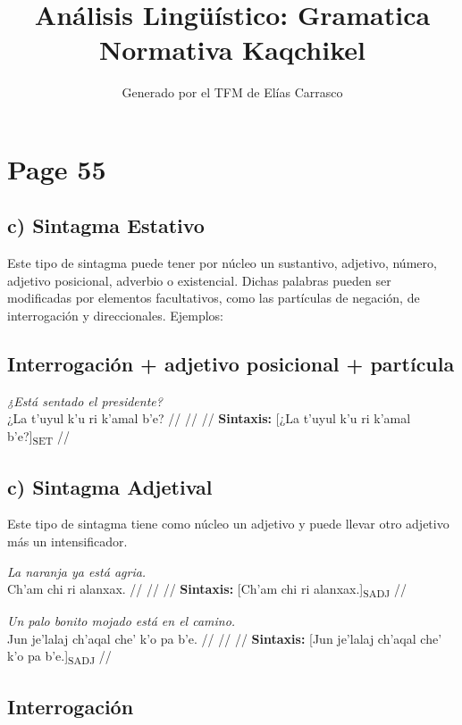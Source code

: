 \documentclass{article}%
\title{Análisis Lingüístico: Gramatica Normativa Kaqchikel}%
\author{Generado por el TFM de Elías Carrasco}%
\begin{document}
%
\normalsize%
\maketitle%
\section{Page 55}%
\label{sec:Page55}%
\subsection{c) Sintagma Estativo}%
\label{subsec:c)SintagmaEstativo}%

%
Este tipo de sintagma puede tener por núcleo un sustantivo, adjetivo, número, adjetivo %
posicional, adverbio o existencial. Dichas palabras pueden ser modificadas por %
elementos facultativos, como las partículas de negación, de interrogación y direccionales. %
Ejemplos: %
\subsection{Interrogación + adjetivo posicional + partícula}%
\label{subsec:Interrogacin+adjetivoposicional+partcula}%

%
\par\medskip%
\ex
\textit{¿Está sentado el presidente?} \\
\begingl
\gla ¿La t’uyul k’u ri k’amal b'e? //
\glb  //
\glc  //
\glft \textbf{Sintaxis:} [¿La t’uyul k’u ri k’amal b'e?]\textsubscript{SET} //
\endgl
\xe
%
\medskip%
\subsection{c) Sintagma Adjetival}%
\label{subsec:c)SintagmaAdjetival}%

%
Este tipo de sintagma tiene como núcleo un adjetivo y puede llevar otro adjetivo más un %
intensificador. %
\par\medskip%
\ex
\textit{La naranja ya está agria.} \\
\begingl
\gla Ch'am chi ri alanxax. //
\glb  //
\glc  //
\glft \textbf{Sintaxis:} [Ch'am chi ri alanxax.]\textsubscript{SADJ} //
\endgl
\xe
%
\medskip%
\par\medskip%
\ex
\textit{Un palo bonito mojado está en el camino.} \\
\begingl
\gla Jun je’lalaj ch’aqal che' k'o pa b'e. //
\glb  //
\glc  //
\glft \textbf{Sintaxis:} [Jun je’lalaj ch’aqal che' k'o pa b'e.]\textsubscript{SADJ} //
\endgl
\xe
%
\medskip%
\subsection{Interrogación}%
\label{subsec:Interrogacin}%
\end{document}
